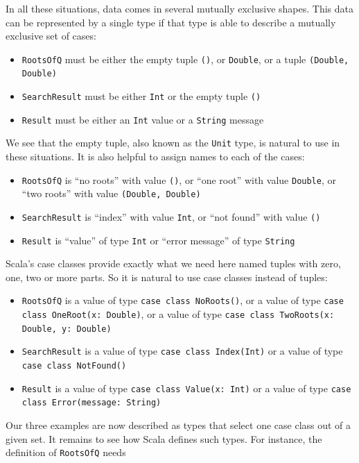 In all these situations, data comes in several mutually exclusive
shapes. This data can be represented by a single type if that type
is able to describe a mutually exclusive set of cases:
\begin{itemize}
\item \lstinline!RootsOfQ! must be either the empty tuple \lstinline!()!,
or \lstinline!Double!, or a tuple \lstinline!(Double, Double)!
\item \lstinline!SearchResult! must be either \lstinline!Int! or the empty
tuple \lstinline!()!
\item \lstinline!Result! must be either an \lstinline!Int! value or a
\lstinline!String! message
\end{itemize}
We see that the empty tuple, also known as the \lstinline!Unit! type,
is natural to use in these situations. It is also helpful to assign
names to each of the cases:
\begin{itemize}
\item \lstinline!RootsOfQ! is ``no roots'' with value \lstinline!()!,
or ``one root'' with value \lstinline!Double!, or ``two roots''
with value \lstinline!(Double, Double)!
\item \lstinline!SearchResult! is ``index'' with value \lstinline!Int!,
or ``not found'' with value \lstinline!()!
\item \lstinline!Result! is ``value'' of type \lstinline!Int! or ``error
message'' of type \lstinline!String!
\end{itemize}
Scala's case classes provide exactly what we need here \textemdash{}
named tuples with zero, one, two or more parts. So it is natural to
use case classes instead of tuples:
\begin{itemize}
\item \lstinline!RootsOfQ! is a value of type \lstinline!case class NoRoots()!,
or a value of type \lstinline!case class OneRoot(x: Double)!, or
a value of type \lstinline!case class TwoRoots(x: Double, y: Double)!
\item \lstinline!SearchResult! is a value of type \lstinline!case class Index(Int)!
or a value of type \lstinline!case class NotFound()!
\item \lstinline!Result! is a value of type \lstinline!case class Value(x: Int)!
or a value of type \lstinline!case class Error(message: String)!
\end{itemize}
Our three examples are now described as types that select one case
class out of a given set. It remains to see how Scala defines such
types. For instance, the definition of \lstinline!RootsOfQ! needs
